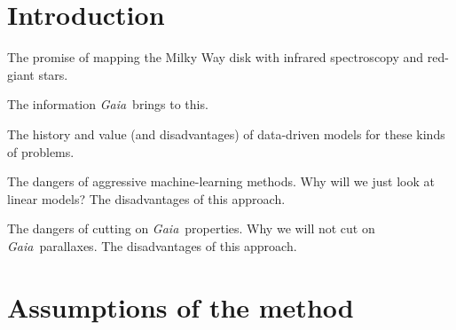 \documentclass[modern]{aastex62}
\newcommand{\project}[1]{\textsl{#1}}
\newcommand{\gaia}{\project{Gaia}}
\begin{document}

\section{Introduction} \label{sec:intro}

The promise of mapping the Milky Way disk with infrared spectroscopy
and red-giant stars.

The information \gaia\ brings to this.

The history and value (and disadvantages)
of data-driven models for these kinds of problems.

The dangers of aggressive machine-learning methods. Why will we just
look at linear models? The disadvantages of this approach.

The dangers of cutting on \gaia\ properties. Why we will not cut on
\gaia\ parallaxes. The disadvantages of this approach.

\section{Assumptions of the method}
\end{document}
